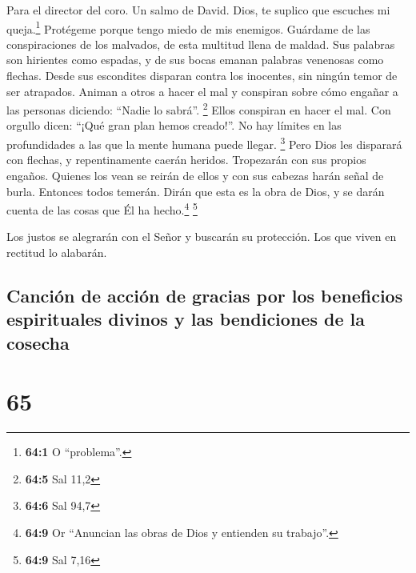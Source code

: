 Para el director del coro. Un salmo de David.  Dios, te
suplico que escuches mi queja.\footnote{\textbf{64:1} O ``problema''.}
Protégeme porque tengo miedo de mis enemigos.  Guárdame de
las conspiraciones de los malvados, de esta multitud llena de maldad.
 Sus palabras son hirientes como espadas, y de sus bocas
emanan palabras venenosas como flechas.  Desde sus
escondites disparan contra los inocentes, sin ningún temor de ser
atrapados.  Animan a otros a hacer el mal y conspiran
sobre cómo engañar a las personas diciendo: ``Nadie lo sabrá''.
\footnote{\textbf{64:5} Sal 11,2}  Ellos conspiran en
hacer el mal. Con orgullo dicen: ``¡Qué gran plan hemos creado!''. No
hay límites en las profundidades a las que la mente humana puede llegar.
\footnote{\textbf{64:6} Sal 94,7}  Pero Dios les disparará
con flechas, y repentinamente caerán heridos.  Tropezarán
con sus propios engaños. Quienes los vean se reirán de ellos y con sus
cabezas harán señal de burla.  Entonces todos temerán.
Dirán que esta es la obra de Dios, y se darán cuenta de las cosas que Él
ha hecho.\footnote{\textbf{64:9} Or ``Anuncian las obras de Dios y
  entienden su trabajo''.} \footnote{\textbf{64:9} Sal 7,16}

 Los justos se alegrarán con el Señor y buscarán su
protección. Los que viven en rectitud lo alabarán.

\hypertarget{canciuxf3n-de-acciuxf3n-de-gracias-por-los-beneficios-espirituales-divinos-y-las-bendiciones-de-la-cosecha}{%
\subsection{Canción de acción de gracias por los beneficios espirituales
divinos y las bendiciones de la
cosecha}\label{canciuxf3n-de-acciuxf3n-de-gracias-por-los-beneficios-espirituales-divinos-y-las-bendiciones-de-la-cosecha}}

\hypertarget{section-64}{%
\section{65}\label{section-64}}

